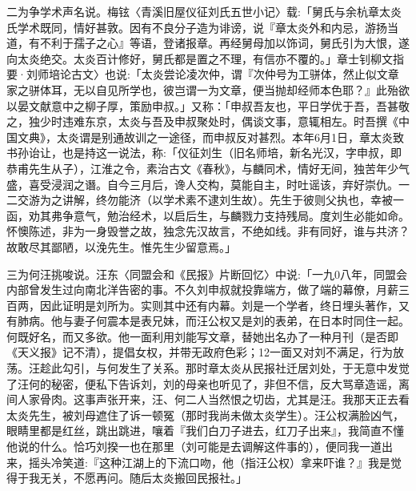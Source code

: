 二为争学术声名说。梅铉〈青溪旧屋仪征刘氏五世小记〉载:「舅氏与余杭章太炎氏学术既同，情好甚敦。因有不良分子造为诽谤，说『章太炎外和内忌，游扬当道，有不利于孺子之心』等语，登诸报章。再经舅母加以饰词，舅氏引为大恨，遂向太炎绝交。太炎百计修好，舅氏都是置之不理，有信亦不覆的。」章士钊柳文指要·刘师培论古文〉也说:「太炎尝论凌次仲，谓『次仲号为工骈体，然止似文章家之骈体耳，无以自见所学也，彼岂谓一为文章，便当抛却经师本色耶？』此殆欲以晏文献意中之柳子厚，策励申叔。」又称：「申叔吾友也，平日学优于吾，吾甚敬之，独少时违难东京，太炎与吾及申叔聚处时，偶谈文事，意辄相左。时吾撰《中国文典》，太炎谓是别通故训之一途径，而申叔反对甚烈。本年6月1日，章太炎致书孙诒让，也是持这一说法，称:「仪征刘生（旧名师培，新名光汉，字申叔，即恭甫先生从子），江淮之令，素治古文《春秋》，与麟同术，情好无间，独苦年少气盛，喜受浸润之谮。自今三月后，谗人交构，莫能自主，时吐谣该，弃好崇仇。一二交游为之讲解，终勿能济（以学术素不逮刘生故）。先生于彼则父执也，幸被一函，劝其弗争意气，勉治经术，以启后生，与麟戮力支持残局。度刘生必能如命。怀懊陈述，非为一身毁誉之故，独念先汉故言，不绝如线。非有同好，谁与共济？故敢尽其鄙陋，以浼先生。惟先生少留意焉。」

\vfill
\begin{BookNotes}
\end{BookNotes}

三为何汪挑唆说。汪东〈同盟会和《民报》片断回忆〉中说:「一九0八年，同盟会内部曾发生过向南北洋告密的事。不久刘申叔就投靠端方，做了端的幕僚，月薪三百两，因此证明是刘所为。实则其中还有内幕。刘是一个学者，终日埋头著作，又有肺病。他与妻子何震本是表兄妹，而汪公权又是刘的表弟，在日本时同住一起。何既好名，而又多欲。他一面利用刘能写文章，替她出名办了一种月刊（是否即《天义报》记不清），提倡女权，并带无政府色彩；12一面又对刘不满足，行为放荡。汪趁此勾引，与何发生了关系。那时章太炎从民报社迁居刘处，于无意中发觉了汪何的秘密，便私下告诉刘，刘的母亲也听见了，非但不信，反大骂章造谣，离间人家骨肉。这事声张开来，汪、何二人当然恨之切齿，尤其是汪。我那天正去看太炎先生，被刘母遮住了诉一顿冤（那时我尚未做太炎学生）。汪公权满脸凶气，眼睛里都是红丝，跳出跳进，嚷着『我们白刀子进去，红刀子出来』，我简直不懂他说的什么。恰巧刘揆一也在那里（刘可能是去调解这件事的），便同我一道出来，摇头冷笑道:『这种江湖上的下流口吻，他（指汪公权）拿来吓谁？』我是觉得于我无关，不愿再问。随后太炎搬回民报社。」

